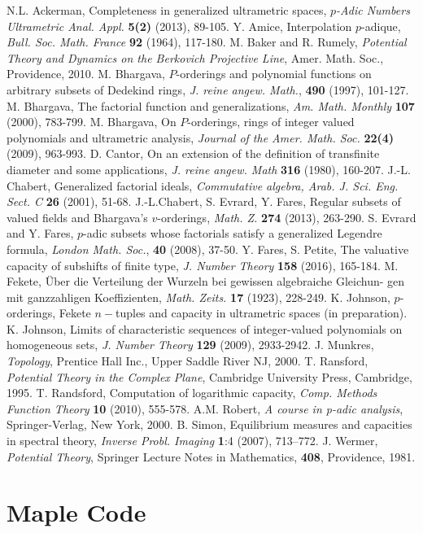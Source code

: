 \documentclass[12pt, glossary]{dalthesis}
\theoremstyle{plain}
\theoremstyle{definition}
\begin{document}
\begin{thebibliography}{9}
 N.L. Ackerman, Completeness in generalized ultrametric spaces, \textit{$p$-Adic Numbers Ultrametric Anal. Appl.} \textbf{5(2)} (2013), 89-105.
 Y. Amice, Interpolation $p$-adique, \textit{Bull. Soc. Math. France} \textbf{92} (1964), 117-180.
 M. Baker and R. Rumely, \textit{Potential Theory and Dynamics on the Berkovich
Projective Line}, Amer. Math. Soc., Providence, 2010.
 M. Bhargava, $P$-orderings and polynomial functions on arbitrary subsets of Dedekind
rings, \textit{J. reine angew. Math.}, \textbf{490} (1997), 101-127.
 M. Bhargava, The factorial function and generalizations, \textit{Am. Math. Monthly}
\textbf{107} (2000), 783-799.
 M. Bhargava, On $P$-orderings, rings of integer valued polynomials and ultrametric
analysis, \textit{Journal of the Amer. Math. Soc.} \textbf{22(4)} (2009), 963-993.
  D. Cantor, On an extension of the definition of transfinite diameter and some applications, \textit{J. reine angew. Math} \textbf{316} (1980), 160-207.  
 J.-L. Chabert, Generalized factorial ideals, \textit{Commutative algebra, Arab. J. Sci. Eng.
Sect. C} \textbf{26} (2001), 51-68.
 J.-L.Chabert, S. Evrard, Y. Fares, Regular subsets of valued fields and Bhargava’s $v$-orderings, \textit{Math. Z.} \textbf{274} (2013), 263-290.
 S. Evrard and Y. Fares, $p$-adic subsets whose factorials satisfy a generalized Legendre
formula, \textit{London Math. Soc.}, \textbf{40} (2008), 37-50.
 Y. Fares, S. Petite, The valuative capacity of subshifts of finite type, \textit{J. Number Theory} \textbf{158}
(2016), 165-184.
 M. Fekete, \"Uber die Verteilung der Wurzeln bei gewissen algebraiche Gleichun-
gen mit ganzzahligen Koeffizienten, \textit{Math. Zeits.} \textbf{17} (1923), 228-249.
 K. Johnson, $p$-orderings, Fekete $n-$tuples and capacity in ultrametric spaces (in preparation).
 K. Johnson, Limits of characteristic sequences of integer-valued polynomials on
homogeneous sets, \textit{J. Number Theory} \textbf{129} (2009), 2933-2942.
 J. Munkres, \textit{Topology}, Prentice Hall Inc., Upper Saddle River NJ, 2000.
 T. Ransford, \textit{Potential Theory in the Complex Plane}, Cambridge University Press, Cambridge, 1995.
 T. Randsford, Computation of logarithmic capacity, \textit{Comp. Methods Function Theory} \textbf{10} (2010), 555-578.
 A.M. Robert, \textit{A course in p-adic analysis}, Springer-Verlag, New York, 2000.
 B. Simon, Equilibrium measures and capacities in spectral theory, \textit{Inverse Probl. Imaging} \textbf{1}:4 (2007), 713–772. 
 J. Wermer, \textit{Potential Theory}, Springer Lecture Notes in Mathematics, \textbf{408}, Providence, 1981.
\end{thebibliography}

\appendix
\chapter{Maple Code}
	
\end{document}
